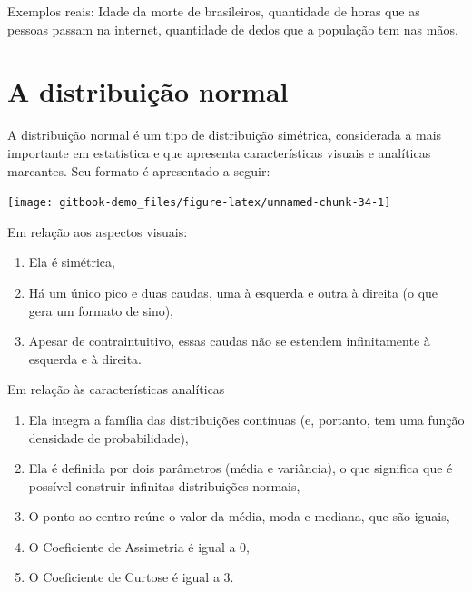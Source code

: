 \documentclass[
]{book}
\providecommand{\tightlist}{%
  \setlength{\itemsep}{0pt}\setlength{\parskip}{0pt}}
\begin{document}
Exemplos reais: Idade da morte de brasileiros, quantidade de horas que as pessoas passam na internet, quantidade de dedos que a população tem nas mãos.

\hypertarget{a-distribuiuxe7uxe3o-normal}{%
\section{A distribuição normal}\label{a-distribuiuxe7uxe3o-normal}}

A distribuição normal é um tipo de distribuição simétrica, considerada a mais importante em estatística e que apresenta características visuais e analíticas marcantes. Seu formato é apresentado a seguir:

\begin{center}\texttt{[image: gitbook-demo\_files/figure-latex/unnamed-chunk-34-1]} \end{center}

Em relação aos aspectos visuais:

\begin{enumerate}
\def\labelenumi{\arabic{enumi})}
\tightlist
\item
  Ela é simétrica,\\
\item
  Há um único pico e duas caudas, uma à esquerda e outra à direita (o que gera um formato de sino),\\
\item
  Apesar de contraintuitivo, essas caudas não se estendem infinitamente à esquerda e à direita.
\end{enumerate}

Em relação às características analíticas

\begin{enumerate}
\def\labelenumi{\arabic{enumi})}
\tightlist
\item
  Ela integra a família das distribuições contínuas (e, portanto, tem uma função densidade de probabilidade),
\item
  Ela é definida por dois parâmetros (média e variância), o que significa que é possível construir infinitas distribuições normais,\\
\item
  O ponto ao centro reúne o valor da média, moda e mediana, que são iguais,\\
\item
  O Coeficiente de Assimetria é igual a 0,\\
\item
  O Coeficiente de Curtose é igual a 3.
\end{enumerate}
\end{document}
